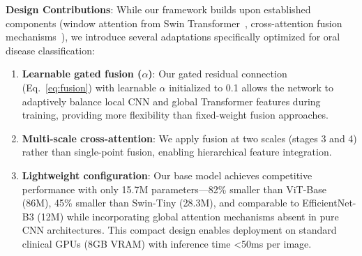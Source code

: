 \begin{table}[htbp]
\centering
\caption{Model configurations and hyperparameters}
\label{tab:model_configs}
\end{table}

\textbf{Design Contributions}: While our framework builds upon established components (window attention from Swin Transformer~\cite{liu2021swin}, cross-attention fusion mechanisms~\cite{chen2021transunet}), we introduce several adaptations specifically optimized for oral disease classification:
\begin{enumerate}
    \item \textbf{Learnable gated fusion ($\alpha$)}: Our gated residual connection (Eq.~\ref{eq:fusion}) with learnable $\alpha$ initialized to 0.1 allows the network to adaptively balance local CNN and global Transformer features during training, providing more flexibility than fixed-weight fusion approaches.
    \item \textbf{Multi-scale cross-attention}: We apply fusion at two scales (stages 3 and 4) rather than single-point fusion, enabling hierarchical feature integration.
    \item \textbf{Lightweight configuration}: Our base model achieves competitive performance with only 15.7M parameters---82\% smaller than ViT-Base (86M), 45\% smaller than Swin-Tiny (28.3M), and comparable to EfficientNet-B3 (12M) while incorporating global attention mechanisms absent in pure CNN architectures. This compact design enables deployment on standard clinical GPUs (8GB VRAM) with inference time <50ms per image.
\end{enumerate}


